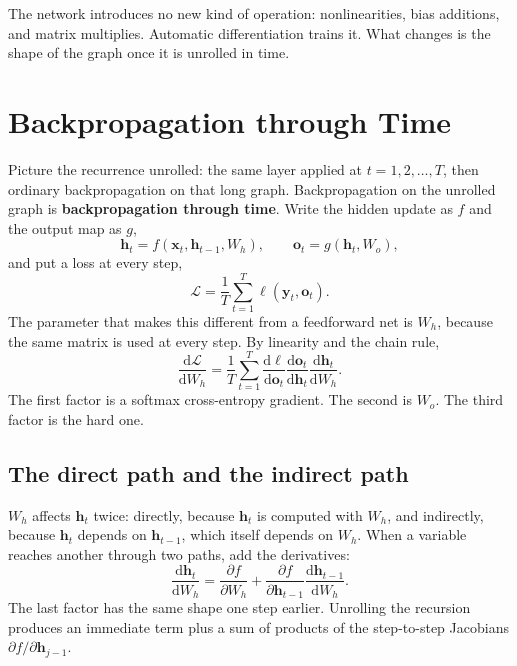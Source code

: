\documentclass[11pt]{article}
\begin{document}
The network introduces no new kind of operation: nonlinearities, bias
additions, and matrix multiplies. Automatic differentiation trains it.
What changes is the shape of the graph once it is unrolled in time.

\section{Backpropagation through Time}
\label{sec:bptt}

Picture the recurrence unrolled: the same layer applied at
\(t=1,2,\ldots,T\), then ordinary backpropagation on that long graph.
Backpropagation on the unrolled graph is \textbf{backpropagation through
time}. Write the hidden update as \(f\) and the output map as \(g\),
\[
\mathbf{h}_t=f(\mathbf{x}_t,\mathbf{h}_{t-1},W_h),
\qquad
\mathbf{o}_t=g(\mathbf{h}_t,W_o),
\]
and put a loss at every step,
\[
\mathcal{L}
=
\frac{1}{T}\sum_{t=1}^{T}\ell(\mathbf{y}_t,\mathbf{o}_t).
\]
The parameter that makes this different from a feedforward net is \(W_h\),
because the same matrix is used at every step. By linearity and the chain
rule,
\[
\frac{\mathrm{d}\mathcal{L}}{\mathrm{d}W_h}
=
\frac{1}{T}\sum_{t=1}^{T}
\frac{\mathrm{d}\ell}{\mathrm{d}\mathbf{o}_t}
\frac{\mathrm{d}\mathbf{o}_t}{\mathrm{d}\mathbf{h}_t}
\frac{\mathrm{d}\mathbf{h}_t}{\mathrm{d}W_h}.
\]
The first factor is a softmax cross-entropy gradient. The second is
\(W_o\). The third factor is the hard one.

\subsection{The direct path and the indirect path}

\(W_h\) affects \(\mathbf{h}_t\) twice: directly, because \(\mathbf{h}_t\) is
computed with \(W_h\), and indirectly, because \(\mathbf{h}_t\) depends on
\(\mathbf{h}_{t-1}\), which itself depends on \(W_h\). When a variable
reaches another through two paths, add the derivatives:
\begin{equation}
\label{eq:bptt-recursion}
\frac{\mathrm{d}\mathbf{h}_t}{\mathrm{d}W_h}
=
\frac{\partial f}{\partial W_h}
+
\frac{\partial f}{\partial\mathbf{h}_{t-1}}
\frac{\mathrm{d}\mathbf{h}_{t-1}}{\mathrm{d}W_h}.
\end{equation}
The last factor has the same shape one step earlier. Unrolling the
recursion produces an immediate term plus a sum of products of the
step-to-step Jacobians \(\partial f/\partial\mathbf{h}_{j-1}\).
\end{document}

